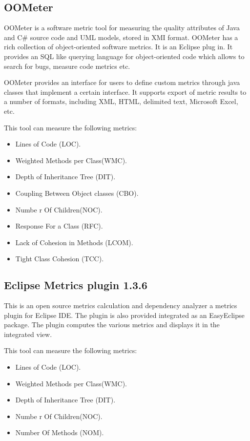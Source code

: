 \subsection{OOMeter}

OOMeter is a software metric tool for measuring the quality attributes of Java and C\# source code and UML models, stored in XMI format. OOMeter has a rich collection of object-oriented software metrics. It is an Eclipse plug in. It provides an SQL like querying language for object-oriented code which
allows to search for bugs, measure code metrics etc.

OOMeter provides an interface for users to define custom metrics through java classes that implement a certain interface. It supports export of metric results to a number of formats, including XML, HTML, delimited text, Microsoft Excel, etc.

This tool can measure the following metrics:

\begin{itemize}
	\item Lines of Code (LOC). 
	\item Weighted Methods per Class(WMC).
	\item Depth of Inheritance Tree (DIT).
	\item Coupling Between Object classes (CBO).
	\item Numbe r Of Children(NOC).
	\item Response For a Class (RFC).
	\item Lack of Cohesion in Methods (LCOM).
	\item Tight Class Cohesion (TCC).
\end{itemize}



\subsection{Eclipse Metrics plugin 1.3.6}

This  is an open source metrics calculation and dependency analyzer a  metrics plugin for Eclipse IDE. The plugin is also provided 
integrated  as  an  EasyEclipse  package.  The  plugin computes   the  various metrics and displays it in the integrated view.


This tool can measure the following metrics:

\begin{itemize}
	\item Lines of Code (LOC). 
	\item Weighted Methods per Class(WMC).
	\item Depth of Inheritance Tree (DIT).
 	\item Numbe r Of Children(NOC).
    \item Number Of Methods (NOM).
\end{itemize}

